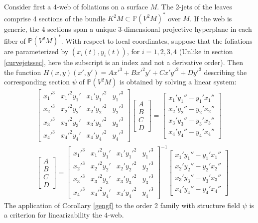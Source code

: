 \documentclass[12pt]{article}
\numberwithin{equation}{section}
\theoremstyle{plain}
\theoremstyle{definition}
\renewcommand{\P}{\mathbb{P}}
\begin{document}
Consider first a 4-web of foliations on a surface $M$. The 2-jets of the leaves comprise 4 sections of the bundle $K^{2}M\subset \P(V^{2}M)^{*}$ over $M$. If the web is generic, the 4 sections span a unique 3-dimensional projective hyperplane in each fiber of $\P(V^{2}M)^{*}$. With respect to local coordinates, suppose that the foliations are parameterized by $(x_{i}(t),y_{i}(t))$, for $i=1,2,3,4$ (Unlike in section \ref{curvejetssec}, here the subscript is an index and not a derivative order). Then the function $H(x,y)(x',y')=Ax'^{3}+Bx'^{2}y'+Cx'y'^{2}+Dy'^{3}$ describing the corresponding section $\psi$ of $\P(V^{2}M)$ is obtained by solving a linear system:
\begin{align*}
&\begin{bmatrix}
x_{1}'^{3} & x_{1}'^{2}y_{1}' & x_{1}'y_{1}'^{2} & y_{1}'^{3}\\
x_{2}'^{3} & x_{2}'^{2}y_{2}' & x_{2}'y_{2}'^{2} & y_{2}'^{3}\\
x_{3}'^{3} & x_{3}'^{2}y_{3}' & x_{3}'y_{3}'^{2} & y_{3}'^{3}\\
x_{4}'^{3} & x_{4}'^{2}y_{4}' & x_{4}'y_{4}'^{2} & y_{4}'^{3}
\end{bmatrix}
\begin{bmatrix}
A\\
B\\
C\\
D
\end{bmatrix}
=
\begin{bmatrix}
x_{1}'y_{1}''-y_{1}'x_{1}''\\
x_{2}'y_{2}''-y_{2}'x_{2}''\\
x_{3}'y_{3}''-y_{3}'x_{3}''\\
x_{4}'y_{4}''-y_{4}'x_{4}''
\end{bmatrix}\\
&
\begin{bmatrix}
A\\
B\\
C\\
D
\end{bmatrix}
=
\begin{bmatrix}
x_{1}'^{3} & x_{1}'^{2}y_{1}' & x_{1}'y_{1}'^{2} & y_{1}'^{3}\\
x_{2}'^{3} & x_{2}'^{2}y_{2}' & x_{2}'y_{2}'^{2} & y_{2}'^{3}\\
x_{3}'^{3} & x_{3}'^{2}y_{3}' & x_{3}'y_{3}'^{2} & y_{3}'^{3}\\
x_{4}'^{3} & x_{4}'^{2}y_{4}' & x_{4}'y_{4}'^{2} & y_{4}'^{3}
\end{bmatrix}^{-1}
\begin{bmatrix}
x_{1}'y_{1}''-y_{1}'x_{1}''\\
x_{2}'y_{2}''-y_{2}'x_{2}''\\
x_{3}'y_{3}''-y_{3}'x_{3}''\\
x_{4}'y_{4}''-y_{4}'x_{4}''
\end{bmatrix}
\end{align*}
The application of Corollary \ref{gengf} to the order 2 family with structure field $\psi$ is a criterion for linearizability the $4$-web.
\end{document}
